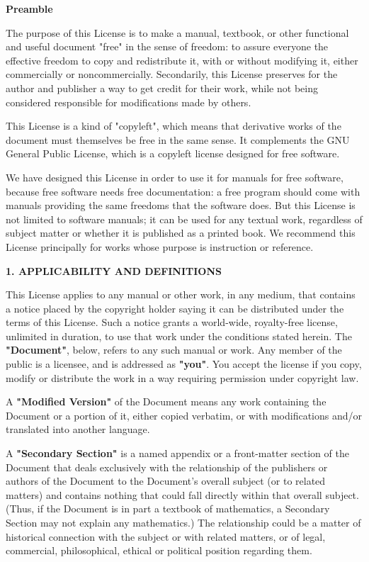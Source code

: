 \documentclass[a4paper,11pt]{article}
\begin{document}
\begin{center}
{\bf\large Preamble}
\end{center}

The purpose of this License is to make a manual, textbook, or other
functional and useful document "free" in the sense of freedom: to
assure everyone the effective freedom to copy and redistribute it,
with or without modifying it, either commercially or noncommercially.
Secondarily, this License preserves for the author and publisher a way
to get credit for their work, while not being considered responsible
for modifications made by others.

This License is a kind of "copyleft", which means that derivative
works of the document must themselves be free in the same sense.  It
complements the GNU General Public License, which is a copyleft
license designed for free software.

We have designed this License in order to use it for manuals for free
software, because free software needs free documentation: a free
program should come with manuals providing the same freedoms that the
software does.  But this License is not limited to software manuals;
it can be used for any textual work, regardless of subject matter or
whether it is published as a printed book.  We recommend this License
principally for works whose purpose is instruction or reference.


\begin{center}
{\Large\bf 1. APPLICABILITY AND DEFINITIONS}
\end{center}

This License applies to any manual or other work, in any medium, that
contains a notice placed by the copyright holder saying it can be
distributed under the terms of this License.  Such a notice grants a
world-wide, royalty-free license, unlimited in duration, to use that
work under the conditions stated herein.  The \textbf{"Document"}, below,
refers to any such manual or work.  Any member of the public is a
licensee, and is addressed as \textbf{"you"}.  You accept the license if you
copy, modify or distribute the work in a way requiring permission
under copyright law.

A \textbf{"Modified Version"} of the Document means any work containing the
Document or a portion of it, either copied verbatim, or with
modifications and/or translated into another language.

A \textbf{"Secondary Section"} is a named appendix or a front-matter section of
the Document that deals exclusively with the relationship of the
publishers or authors of the Document to the Document's overall subject
(or to related matters) and contains nothing that could fall directly
within that overall subject.  (Thus, if the Document is in part a
textbook of mathematics, a Secondary Section may not explain any
mathematics.)  The relationship could be a matter of historical
connection with the subject or with related matters, or of legal,
commercial, philosophical, ethical or political position regarding
them.
\end{document}
